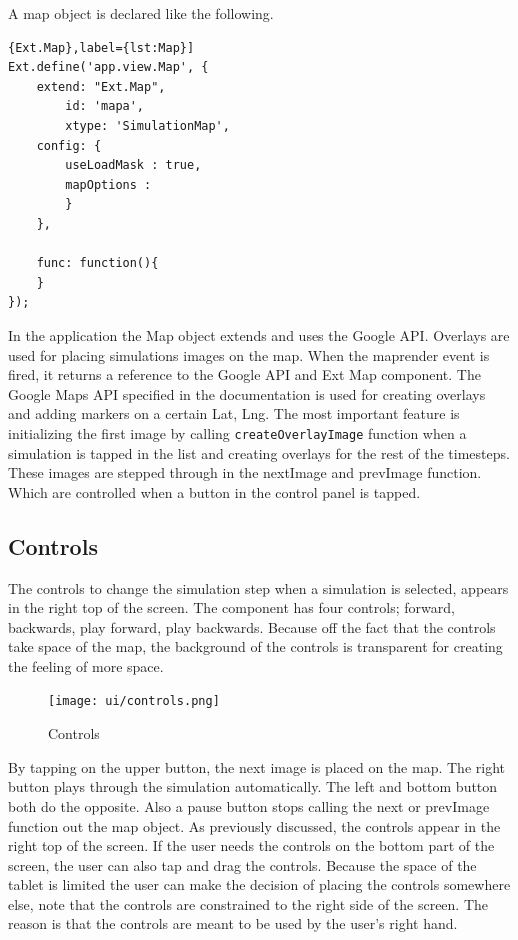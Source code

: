 A map object is declared like the following.
\begin{lstlisting}{Ext.Map},label={lst:Map}]
Ext.define('app.view.Map', {
	extend: "Ext.Map",
		id: 'mapa',
		xtype: 'SimulationMap',
	config: {
		useLoadMask : true,
		mapOptions : 
		}
	},
	
	func: function(){
	}
});	
\end{lstlisting}
In the application the Map object extends and uses the Google API. Overlays are used for placing simulations images on the map. When the maprender event is fired, it returns a reference to the Google API and Ext Map component. The Google Maps API specified in the documentation is used for creating overlays and adding markers on a certain Lat, Lng. The most important feature is initializing the first image by calling \texttt{createOverlayImage} function when a simulation is tapped in the list and creating overlays for the rest of the timesteps. These images are stepped through in the nextImage and prevImage function. Which are controlled when a button in the control panel is tapped.

\subsection{Controls}
The controls to change the simulation step when a simulation is selected, appears in the right top of the screen. The component has four controls; forward, backwards, play forward, play backwards. Because off the fact that the controls take space of the map, the background of the controls is transparent for creating the feeling of more space.
\begin{figure}[H]
\center
\texttt{[image: ui/controls.png]}
\caption{Controls}
\label{fig:controls}
\end{figure}
By tapping on the upper button, the next image is placed on the map. The right button plays through the simulation automatically. The left and bottom button both do the opposite. Also a pause button stops calling the next or prevImage function out the map object. As previously discussed, the controls appear in the right top of the screen. If the user needs the controls on the bottom part of the screen, the user can also tap and drag the controls. Because the space of the tablet is limited the user can make the decision of placing the controls somewhere else, note that the controls are constrained to the right side of the screen. The reason is that the controls are meant to be used by the user's right hand.
 
